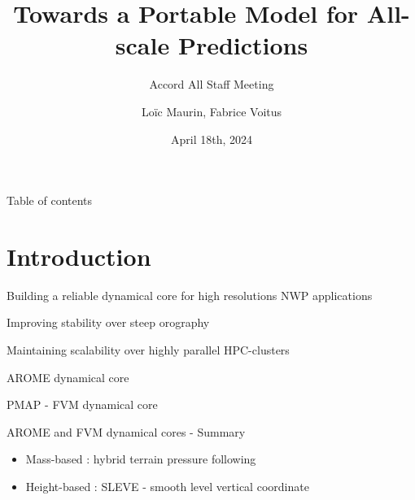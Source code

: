 \documentclass{beamer}
\title[Accord All Staff Meeting]{Towards a Portable Model for All-scale Predictions}
\subtitle{Accord All Staff Meeting}
\author{Loïc Maurin, Fabrice Voitus}
\institute[CNRM]{Centre National de Recherche Météorologique}
\date{April 18th, 2024}
\begin{document}
\frame{\titlepage}

\begin{frame}{Table of contents}
    \tableofcontents
\end{frame}

\section{Introduction}

\begin{frame}{Building a reliable dynamical core for high resolutions NWP applications}

    \begin{block}{Improving stability over steep orography}
    \end{block}
    \begin{block}{Maintaining scalability over highly parallel HPC-clusters}
    \end{block}

\end{frame}
    
\begin{frame}{AROME dynamical core}

\end{frame}

\begin{frame}{PMAP - FVM dynamical core}

\end{frame}

\begin{frame}{AROME and FVM dynamical cores - Summary}
    \begin{center}

    \end{center}

    \begin{itemize}
        \item Mass-based : hybrid terrain pressure following
        \item Height-based : SLEVE - smooth level vertical coordinate
    \end{itemize}

\end{frame}
\end{document}

